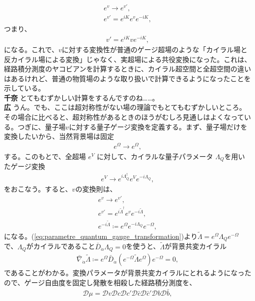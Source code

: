 \documentclass[paper=b5j,fontsize=12Q,jafontsize=12Q,baselineskip=21Q]{jlreq}
\DeclareRobustCommand{\hiron}{\textbf{広 }}
\DeclareRobustCommand{\chinan}{\textbf{千奈 }}
\begin{document}
\begin{refsection}
\begin{gather}
  e^v\to e^{v'},\\
  e^{v'} = e^{iK} e^v e^{-iK},
\end{gather}
つまり、
\begin{align}
  v' = e^{iK} v e^{-iK},
\end{align}
になる。これで、$v$に対する変換性が普通のゲージ超場のような「カイラル場と反カイラル場による変換」じゃなく、実超場による共役変換になった。これは、経路積分測度のヤコビアンを計算するときに、カイラル超空間と全超空間の違いはあるけれど、普通の物質場のような取り扱いで計算できるようになったことを示している。
\\\chinan とてもむずかしい計算をするんですのね……。
\\\hiron うん。でも、ここは超対称性がない場の理論でもとてもむずかしいところ。その場合に比べると、超対称性があるときのほうがむしろ見通しはよくなっている。つぎに、量子場$v$に対する量子ゲージ変換を定義する。まず、量子場だけを変換したいから、当然背景場は固定
\begin{align}
  e^\Omega \to e^\Omega,
\end{align}
する。このもとで、全超場 $e^V$ に対して、カイラルな量子パラメータ $\Lambda_Q$を用いたゲージ変換
\begin{align}
  e^V \to e^{i\Lambda^\dagger_Q} e^V e^{-i\Lambda_Q},
\end{align}
をおこなう。すると、$v$の変換則は、
\begin{gather}
  e^v\to e^{v'},\\
  e^{v'} = e^{i\tilde{\Lambda}^\dagger} e^v e^{-i\tilde{\Lambda}},\\
  e^{-i\tilde{\Lambda}} \coloneqq e^\Omega e^{-i\Lambda_Q} e^{-\Omega},\label{eq:parametre_quantum_gauge_transformation}
\end{gather}
になる。(\ref{eq:parametre_quantum_gauge_transformation})より$\tilde\Lambda= e^\Omega \Lambda_Q e^{-\Omega}$で、$\Lambda_Q$がカイラルであること$\bar{D}_{\dot{\alpha}} \Lambda_Q = 0$を使うと、$\tilde\Lambda$が背景共変カイラル
\begin{align}
  \bar{\nabla}_{\dot{\alpha}} \tilde{\Lambda} \coloneqq e^\Omega \bar{D}_{\dot{\alpha}} \left( e^{-\Omega} \tilde{\Lambda} e^\Omega \right) e^{-\Omega}=0,
\end{align}
であることがわかる。変換パラメータが背景共変カイラルにとれるようになったので、ゲージ自由度を固定し発散を相殺した経路積分測度を、
\begin{align}
  \mathcal{D}\mu = \mathcal{D}v \mathcal{D}c \mathcal{D}c' \mathcal{D}\bar{c} \mathcal{D}\bar{c}' \mathcal{D}b \mathcal{D}\bar{b},\label{eq:functional_measure_gauged_vector_superfield}

\end{align}
\end{refsection}
\end{document}
